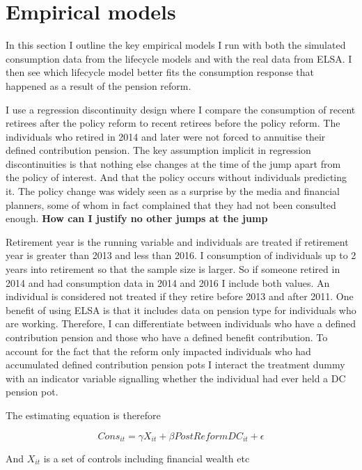\documentclass[12pt]{article}
\begin{document}
\section{Empirical models}

In this section I outline the key empirical models I run with both the simulated consumption data from the
lifecycle models and with the real data from ELSA. I then see which lifecycle model better fits the consumption
response that happened as a result of the pension reform.

I use a regression discontinuity design where I compare the consumption of recent retirees after the policy reform
to recent retirees before the policy reform. The individuals who retired in 2014 and later were not forced to
annuitise their defined contribution pension. The key assumption implicit in regression discontinuities is
that nothing else changes at the time of the jump apart from the policy of interest. And that the policy occurs
without individuals predicting it. The policy change was widely seen as a surprise by the media and financial planners,
some of whom in fact complained that they had not been consulted enough. \textbf{How can I justify no other jumps at the jump}

Retirement year is the running variable and individuals are treated if retirement year is greater than 2013 and less than 2016.
I consumption of individuals up to 2 years into retirement so that the sample size is larger. So if someone retired in 2014 and
had consumption data in 2014 and 2016 I include both values. An individual is considered not treated if they retire before 2013 and after 2011.
One benefit of using ELSA is that it includes data on pension type for individuals who are working. Therefore, I can differentiate
between individuals who have a defined contribution pension and those who have a defined benefit contribution. To account for the fact
that the reform only impacted individuals who had accumulated defined contribution pension pots I interact the treatment dummy with
an indicator variable signalling whether the individual had ever held a DC pension pot.

The estimating equation is therefore

\begin{equation*}
  Cons_{it} =  \gamma X_{it} + \beta PostReformDC_{it} + \epsilon
\end{equation*}

And $X_{it}$ is a set of controls including financial wealth etc
\end{document}
